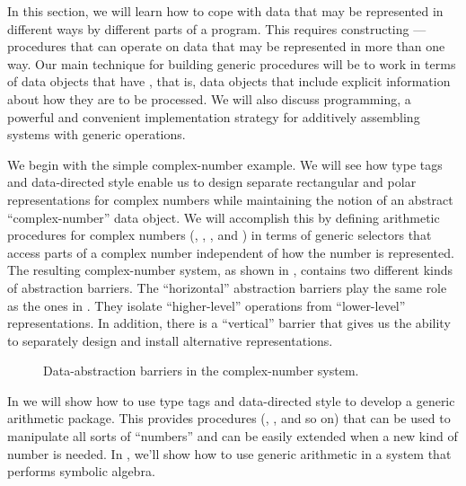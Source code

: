 In this section, we will learn how to cope with data that may be represented in different ways by different parts of a program.
This requires constructing ---procedures that can operate on data that may be represented in more than one way.
Our main technique for building generic procedures will be to work in terms of data objects that have , that is, data objects that include explicit information about how they are to be processed.
We will also discuss  programming, a powerful and convenient implementation strategy for additively assembling systems with generic operations.

We begin with the simple complex-number example.
We will see how type tags and data-directed style enable us to design separate rectangular and polar representations for complex numbers while maintaining the notion of an abstract “complex-number” data object.
We will accomplish this by defining arithmetic procedures for complex numbers (, , , and ) in terms of generic selectors that access parts of a complex number independent of how the number is represented.
The resulting complex-number system, as shown in , contains two different kinds of abstraction barriers.
The “horizontal” abstraction barriers play the same role as the ones in .
They isolate “higher-level” operations from  “lower-level” representations.
In addition, there is a “vertical” barrier that gives us the ability to separately design and install alternative representations.

\begin{figure}[tb]
	\centering
	
	\caption{
		Data-abstraction barriers in the complex-number system.
	}
	\label{Figure 2.19}
\end{figure}

In  we will show how to use type tags and data-directed style to develop a generic arithmetic package.
This provides procedures (, , and so on) that can be used to manipulate all sorts of “numbers” and can be easily extended when a new kind of number is needed.
In , we’ll show how to use generic arithmetic in a system that performs symbolic algebra.




